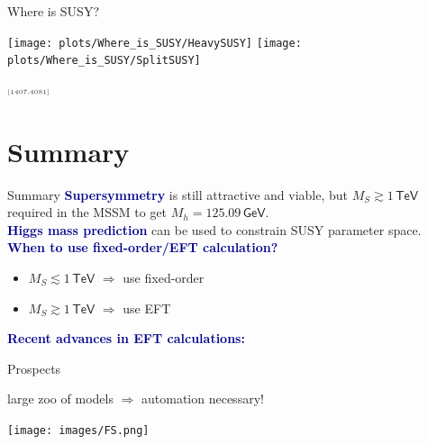 \documentclass[hyperref={pdfpagelabels=false},ngerman]{beamer}
\newcommand{\eh}[1]{\,\mathsf{#1}}
\newcommand{\MS}{\ensuremath{M_S}}
\newcommand{\mycite}[1]{\ensuremath{\text{\textcolor{darkgray}{\tiny [#1]}}}}
\renewcommand{\emph}[1]{\textbf{\textcolor{darkblue}{#1}}}
\newcommand{\GeV}{\eh{GeV}}
\newcommand{\TeV}{\eh{TeV}}
\begin{document}
\begin{frame}{Where is SUSY?}
  \begin{center}
    \texttt{[image: plots/Where\_is\_SUSY/HeavySUSY]}\hfill
    \texttt{[image: plots/Where\_is\_SUSY/SplitSUSY]}
  \end{center}
  \mycite{1407.4081}
\end{frame}


\section{Summary}

\begin{frame}{Summary}
  \emph{Supersymmetry} is still attractive and viable, but
  $\MS \gtrsim 1\TeV$ required in the MSSM to get $M_h = 125.09\GeV$.
  \\[1em]
  \emph{Higgs mass prediction} can be used to constrain SUSY parameter
  space.
  \\[1em]
  \emph{When to use fixed-order/EFT calculation?}
  \begin{itemize}
  \item $\MS \lesssim 1\TeV$ $\Rightarrow$ use fixed-order
  \item $\MS \gtrsim  1\TeV$ $\Rightarrow$ use EFT
  \end{itemize}
  \vspace{1em}
  \emph{Recent advances in EFT calculations:}
  \begin{center}
  \end{center}
\end{frame}

\begin{frame}{Prospects}
  \begin{center}
    \LARGE large zoo of models $\Rightarrow$ automation necessary!
  \end{center}
  \begin{center}
    \texttt{[image: images/FS.png]}
  \end{center}
\end{frame}
\end{document}
